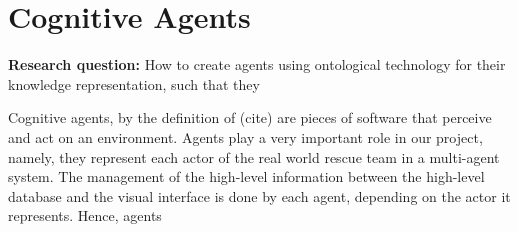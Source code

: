\chapter{Cognitive Agents}

\textbf{Research question:} How to create agents using ontological technology for their knowledge representation, such that they 

Cognitive agents, by the definition of (cite) are pieces of software that perceive and act on an environment. Agents play a very important role in our project, namely, they represent each actor of the real world rescue team in a multi-agent system. The management of the high-level information between the high-level database and the visual interface is done by each agent, depending on the actor it represents. Hence, agents 

